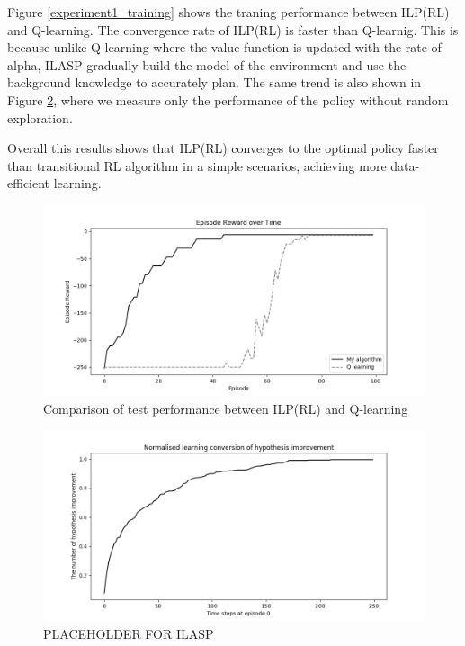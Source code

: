 Figure \ref{experiment1_training} shows the traning performance between ILP(RL) and Q-learning.
The convergence rate of ILP(RL) is faster than Q-learnig. This is because unlike Q-learning where the value function is updated with the rate of alpha, 
ILASP gradually build the model of the environment and use the background knowledge to accurately plan. 
The same trend is also shown in Figure \ref{experiment1_test}, where we measure only the performance of the policy without random exploration.

Overall this results shows that ILP(RL) converges to the optimal policy faster than transitional RL algorithm in a simple scenarios, achieving more data-efficient learning.

\begin{figure}[!htb]
\centering
\includegraphics[width=1.0\textwidth]{./figures/experiment1_test}
\caption{Comparison of test performance between ILP(RL) and Q-learning}
\label{experiment1_test}
\end{figure}

\begin{figure}[!htb]
\centering
\includegraphics[width=1.0\textwidth]{./figures/experiment1_ilasp}
\caption{PLACEHOLDER FOR ILASP}
\label{experiment1_test}
\end{figure}

